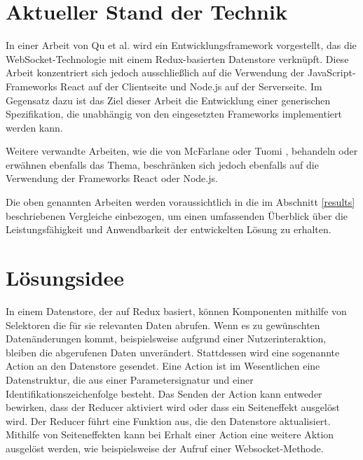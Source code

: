 \documentclass[12pt]{article} %
\begin{document}
\section{Aktueller Stand der Technik}
\label{other-work}

In einer Arbeit von Qu et al. \cite{qu_websocket-based_2019} wird ein Entwicklungsframework vorgestellt, das die WebSocket-Technologie mit einem Redux-basierten Datenstore verknüpft. Diese Arbeit konzentriert sich jedoch ausschließlich auf die Verwendung der JavaScript-Frameworks React auf der Clientseite und Node.js auf der Serverseite. Im Gegensatz dazu ist das Ziel dieser Arbeit die Entwicklung einer generischen Spezifikation, die unabhängig von den eingesetzten Frameworks implementiert werden kann.

Weitere verwandte Arbeiten, wie die von McFarlane \cite{mcfarlane_managing_2019} oder Tuomi \cite{tuomi_automated_2018}, behandeln oder erwähnen ebenfalls das Thema, beschränken sich jedoch ebenfalls auf die Verwendung der Frameworks React oder Node.js.

Die oben genannten Arbeiten werden voraussichtlich in die im Abschnitt \ref{results} beschriebenen Vergleiche einbezogen, um einen umfassenden Überblick über die Leistungsfähigkeit und Anwendbarkeit der entwickelten Lösung zu erhalten.

\section{Lösungsidee}

In einem Datenstore, der auf Redux basiert, können Komponenten mithilfe von Selektoren die für sie relevanten Daten abrufen. Wenn es zu gewünschten Datenänderungen kommt, beispielsweise aufgrund einer Nutzerinteraktion, bleiben die abgerufenen Daten unverändert. Stattdessen wird eine sogenannte Action an den Datenstore gesendet. Eine Action ist im Wesentlichen eine Datenstruktur, die aus einer Parametersignatur und einer Identifikationszeichenfolge besteht. Das Senden der Action kann entweder bewirken, dass der Reducer aktiviert wird oder dass ein Seiteneffekt ausgelöst wird. Der Reducer führt eine Funktion aus, die den Datenstore aktualisiert. Mithilfe von Seiteneffekten kann bei Erhalt einer Action eine weitere Aktion ausgelöst werden, wie beispielsweise der Aufruf einer Websocket-Methode.
\cite[117ff.]{thakkar_building_2020}
\end{document}
